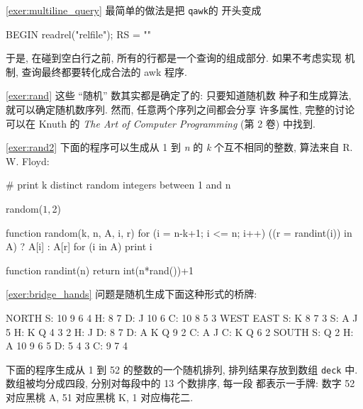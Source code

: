 \myexer\ref{exer:multiline_query} 最简单的做法是把 \texttt{qawk}的
开头变成 
\begin{awkcode}
    BEGIN { readrel("relfile"); RS = "" }
\end{awkcode}
于是, 在碰到空白行之前, 所有的行都是一个查询的组成部分. 如果不考虑实现
机制, 查询最终都要转化成合法的 awk 程序.

\myexer\ref{exer:rand} 这些 ``随机'' 数其实都是确定了的: 只要知道随机数
种子和生成算法, 就可以确定随机数序列. 然而, 任意两个序列之间都会分享
许多属性, 完整的讨论可以在 Knuth 的 \textit{The Art of Computer
Programming} (第 2 卷) 中找到.

\myexer\ref{exer:rand2}  下面的程序可以生成从 1 到 \textit{n} 的 \textit{k}
个互不相同的整数, 算法来自 R. W. Floyd:
\begin{awkcode}
    # print k distinct random integers between 1 and n

    { random($1, $2) }

    function random(k, n,    A, i, r) {
        for (i = n-k+1; i <= n; i++)
            ((r = randint(i)) in A) ? A[i] : A[r]
        for (i in A)
            print i
    }

    function randint(n) { return int(n*rand())+1 }
\end{awkcode}

\myexer\ref{exer:bridge_hands} 问题是随机生成下面这种形式的桥牌:
\begin{awkcode}
                        NORTH
                    S: 10 9 6 4
                    H: 8 7
                    D: J 10 6
                    C: 10 8 5 3
       WEST                                 EAST
    S: K 8 7 3                           S: A J 5
    H: K Q 4 3 2                         H: J
    D: 8 7                               D: A K Q 9 2
    C: A J                               C: K Q 6 2
                        SOUTH
                    S: Q 2
                    H: A 10 9 6 5
                    D: 5 4 3
                    C: 9 7 4
\end{awkcode}
下面的程序生成从 1 到 52 的整数的一个随机排列, 排列结果存放到数组
\texttt{deck} 中. 数组被均分成四段, 分别对每段中的 13 个数排序, 每一段
都表示一手牌: 数字 52 对应黑桃 A, 51 对应黑桃 K, 1 对应梅花二.

